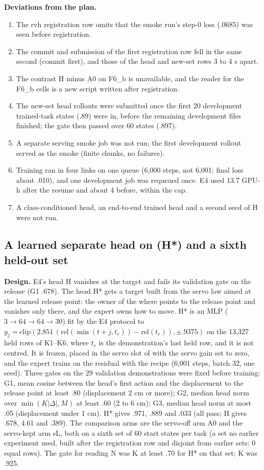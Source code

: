 \textbf{Deviations from the plan.}
\begin{enumerate}
\item The rvh registration row omits that the smoke run's step-0 loss (.0685) was seen before registration.
\item The commit and submission of the first registration row fell in the same second (commit first), and those of the head and new-set rows 3 to 4 s apart.
\item The contrast H minus A0 on F6\_b is unavailable, and the reader for the F6\_b cells is a new script written after registration.
\item The new-set head rollouts were submitted once the first 20 development trained-task states (.89) were in, before the remaining development files finished; the gate then passed over 60 states (.897).
\item A separate serving smoke job was not run; the first development rollout served as the smoke (finite chunks, no failures).
\item Training ran in four links on one queue (6,000 steps, not 6,001; final loss about .010), and one development job was requeued once. E4 used 13.7 GPU-h after the resume and about 4 before, within the cap.
\item A class-conditioned head, an end-to-end trained head and a second seed of H were not run.
\end{enumerate}

\subsection{A learned separate head on \pizero{} (H*) and a sixth held-out set}
\label{app:M5}

\textbf{Design.} E4's head H vanishes at the target and fails its validation gate on the release (G1 .678). The head H* gets a target built from the servo law aimed at the learned release point: the owner of the where points to the release point and vanishes only there, and the expert owns how to move. H* is an MLP ($3\to64\to64\to30$) fit by the E4 protocol to $y_j=\mathrm{clip}(2.851\,(\mathrm{rel}(\min(t+j,t_r))-\mathrm{rel}(t_r)),\pm.9375)$ on the 13,327 held rows of K1--K6, where $t_r$ is the demonstration's last held row, and it is not centred. It is frozen, placed in the servo slot of \pizero{} with the servo gain set to zero, and the expert trains on the residual with the \pizero{} recipe (6,001 steps, batch 32, one seed). Three gates on the 29 validation demonstrations were fixed before training: G1, mean cosine between the head's first action and the displacement to the release point at least .80 (displacement 2 cm or more); G2, median head norm over $\min(K|\Delta|, M)$ at least .60 (2 to 6 cm); G3, median head norm at most .05 (displacement under 1 cm). H* gives .971, .889 and .033 (all pass; H gives .678, 4.61 and .389). The comparison arms are the \pizero{} servo-off arm A0 and the servo-kept arm sL, both on a sixth set of 60 start states per task (a set no earlier experiment used, built after the registration row and disjoint from earlier sets: 0 equal rows). The gate for reading N was K at least .70 for H* on that set; K was .925.

